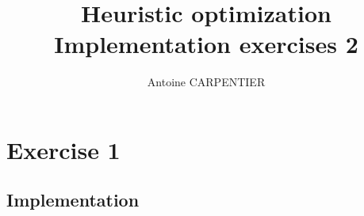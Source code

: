 \documentclass[a4paper,12pt]{article}
\author{Antoine CARPENTIER}
\title{Heuristic optimization\\ \small Implementation exercises 2}
\begin{document}
\maketitle

\section{Exercise 1}

\subsection{Implementation}

% 
\end{document}

